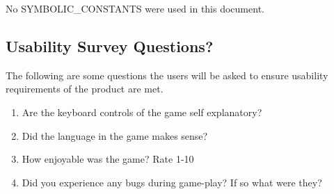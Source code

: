 \documentclass[12pt, titlepage]{article}
\begin{document}
No SYMBOLIC\_CONSTANTS were used in this document.

\subsection{Usability Survey Questions?}

The following are some questions the users will be asked to ensure usability requirements of the product are met. 

\begin{enumerate}
    \item Are the keyboard controls of the game self explanatory?
    
    \item Did the language in the game makes sense?
    
    \item How enjoyable was the game? Rate 1-10

    \item Did you experience any bugs during game-play? If so what were they?
    
\end{enumerate}
\end{document}
